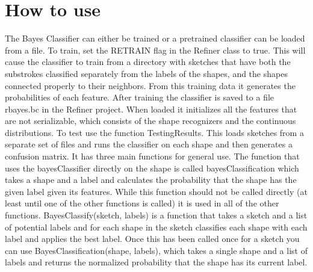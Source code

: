 \documentclass{article}
\begin{document}
\section{How to use}
   The Bayes Classifier can either be trained or a pretrained classifier can be loaded from a file.  To train, set the RETRAIN flag in the Refiner class to true.  This will cause the classifier to train from a directory with sketches that have both the substrokes classified separately from the labels of the shapes, and the shapes connected properly to their neighbors.  From this training data it generates the probabilities of each feature.  After training the classifier is saved to a file rbayes.bc in the Refiner project.		When loaded it initializes all the features that are not serializable, which consists of the shape recognizers and the continuous distributions.  To test use the function TestingResults.  This loads sketches from a separate set of files and runs the classifier on each shape and then generates a confusion matrix.  It has three main functions for general use.  The function that uses the bayesClassifier directly on the shape is called bayesClassification which takes a shape and a label and calculates the probability that the shape has the given label given its features.  While this function should not be called directly (at least until one of the other functions is called) it is used in all of the other functions. BayesClassify(sketch, labels) is a function that takes a sketch and a list of potential labels and for each shape in the sketch classifies each shape with each label and applies the best label.  Once this has been called once for a sketch you can use BayesClassification(shape, labels), which takes a single shape and a list of labels and returns the normalized probability that the shape has its current label.
                        
\end{document}
